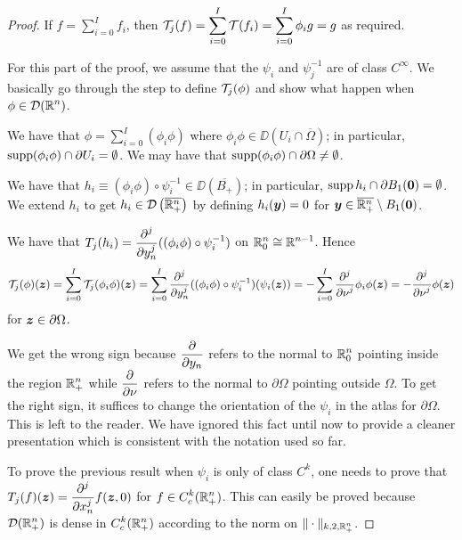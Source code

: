 \begin{proof}
If $\displaystyle f = \sum_{i=0}^I f_i$, then
$\displaystyle \TT_j(f) = \sum_{i=0}^I \TT(f_i) = \sum_{i=0}^I \phi_i g = g$ as
required.

For this part of the proof, we assume that the $\psi_i$ and
$\displaystyle \psi_j^{-1}$ are of class $\displaystyle C^\infty$.  We
basically go through the step to define $\TT_j(\phi)$ and show what happen when
$\displaystyle \phi \in \DD(\RR^n)$.

We have that $\displaystyle \phi = \sum_{i=0}^I (\phi_i \phi)$ where
$\displaystyle \phi_i \phi \in \DD\left(U_i \cap \overline{\Omega}\right)$;
in particular, $\supp (\phi_i \phi) \cap \partial U_i = \emptyset$.
We may have that
$\supp (\phi_i \phi) \cap \partial \Omega \neq \emptyset$.

We have that
$\displaystyle h_i \equiv (\phi_i \phi) \circ \psi_i^{-1}
\in \DD\left(\overline{B_+}\right)$; in particular,
$\displaystyle \supp h_i \cap \partial B_1(\VEC{0}) = \emptyset$.  We
extend $h_i$ to get
$\displaystyle h_i \in \DD\left(\overline{\RR^n_+}\right)$ by defining
$h_i(\VEC{y}) = 0$ for
$\displaystyle \VEC{y} \in \overline{\RR^n_+} \setminus B_1(\VEC{0})$.

We have that $\displaystyle T_j(h_i)
= \pdfdxn{((\phi_i \phi) \circ \psi_i^{-1})}{y_n}{j}$ on
$\displaystyle \RR^n_0 \cong \RR^{n-1}$.  Hence
\[
\TT_j(\phi)(\VEC{z})
= \sum_{i=0}^I \TT_j(\phi_i \phi)(\VEC{z})
= \sum_{i=0}^I \pdfdxn{((\phi_i \phi) \circ \psi_i^{-1})}{y_n}{j}
(\psi_i(\VEC{z}))
= - \sum_{i=0}^I \pdfdxn{\phi_i \phi}{\nu}{j} (\VEC{z})
= -\pdfdxn{\phi}{\nu}{j} (\VEC{z})
\]
for $\VEC{z} \in \partial \Omega$.

We get the wrong sign because $\displaystyle \pdydx{}{y_n}$ refers to
the normal to $\displaystyle \RR^n_0$ pointing inside the region
$\displaystyle \RR^n_+$ while
$\displaystyle \pdydx{}{\nu}$ refers to the normal to $\partial \Omega$
pointing outside $\Omega$.  To get the right sign, it suffices to
change the orientation of the $\psi_i$ in the atlas for $\partial \Omega$.
This is left to the reader.  We have ignored this fact until
now to provide a cleaner presentation which is consistent with the
notation used so far.

To prove the previous result when $\psi_i$ is only of class
$\displaystyle C^k$, one needs to prove that
$\displaystyle T_j(f)(\VEC{z}) = \pdfdxn{f}{x_n}{j}(\VEC{z},0)$
for $\displaystyle f \in C_c^k(\RR^n_+)$.  This can easily be proved
because $\displaystyle \DD(\RR^n_+)$ is dense in
$\displaystyle C_c^k(\RR^n_+)$ according to the norm on
$\displaystyle \|\cdot\|_{k,2,\RR^n_+}$.
\end{proof}

